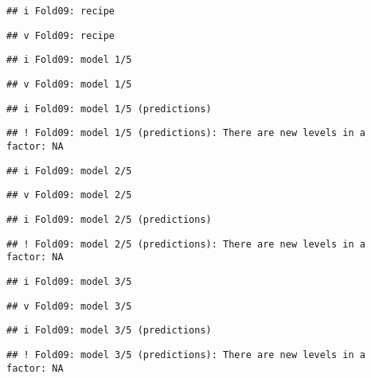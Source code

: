 \documentclass[
]{article}
\begin{document}
\begin{verbatim}
## i Fold09: recipe
\end{verbatim}

\begin{verbatim}
## v Fold09: recipe
\end{verbatim}

\begin{verbatim}
## i Fold09: model 1/5
\end{verbatim}

\begin{verbatim}
## v Fold09: model 1/5
\end{verbatim}

\begin{verbatim}
## i Fold09: model 1/5 (predictions)
\end{verbatim}

\begin{verbatim}
## ! Fold09: model 1/5 (predictions): There are new levels in a factor: NA
\end{verbatim}

\begin{verbatim}
## i Fold09: model 2/5
\end{verbatim}

\begin{verbatim}
## v Fold09: model 2/5
\end{verbatim}

\begin{verbatim}
## i Fold09: model 2/5 (predictions)
\end{verbatim}

\begin{verbatim}
## ! Fold09: model 2/5 (predictions): There are new levels in a factor: NA
\end{verbatim}

\begin{verbatim}
## i Fold09: model 3/5
\end{verbatim}

\begin{verbatim}
## v Fold09: model 3/5
\end{verbatim}

\begin{verbatim}
## i Fold09: model 3/5 (predictions)
\end{verbatim}

\begin{verbatim}
## ! Fold09: model 3/5 (predictions): There are new levels in a factor: NA
\end{verbatim}
\end{document}

